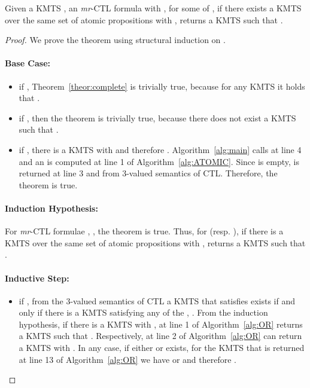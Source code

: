 \begin{thm}[Completeness]
\label{theor:complete}
Given a KMTS , an \textit{mr}-CTL formula  with 
, for some  
of , if there exists a KMTS 
 over the same set  of atomic propositions with 
, 
 returns a 
KMTS  such that 
.    
\end{thm}
\begin{proof}
We prove the theorem using structural induction on .

\paragraph{Base Case:}
\begin{itemize}
\item if , Theorem~\ref{theor:complete} is trivially true, 
because for any KMTS  it holds that 
.    
\item if , then the theorem is trivially true, because 
there does not exist a KMTS  such that 
.   
\item if , there is a KMTS 
with  and therefore .  
Algorithm~\ref{alg:main} calls  
at line 4 and an  
is computed at line 1 of Algorithm~\ref{alg:ATOMIC}.  Since  is empty,  is returned at line 3 and  from 3-valued semantics of CTL.  Therefore, the theorem is true.  
\end{itemize}

\paragraph{Induction Hypothesis:}
For \emph{mr}-CTL formulae , , the theorem is true.  
Thus, for  (resp. ), 
if there is a KMTS  over the same set  of atomic propositions with 
, 
 returns a KMTS 
 such that .  

\paragraph{Inductive Step:}
\begin{itemize}
\item if , from the 3-valued semantics of CTL a 
KMTS that satisfies  exists if and only if there is a KMTS satisfying any of the , .
From the induction hypothesis,
if there is a KMTS  with , 
at line 1 of Algorithm~\ref{alg:OR} returns a KMTS  such that . Respectively,  at line 2 of Algorithm~\ref{alg:OR} can return a KMTS  with . In any case, if either  or  exists, for the KMTS  that is returned at line 13 of Algorithm~\ref{alg:OR} we have  or  and therefore .   


\end{itemize}
\end{proof}
